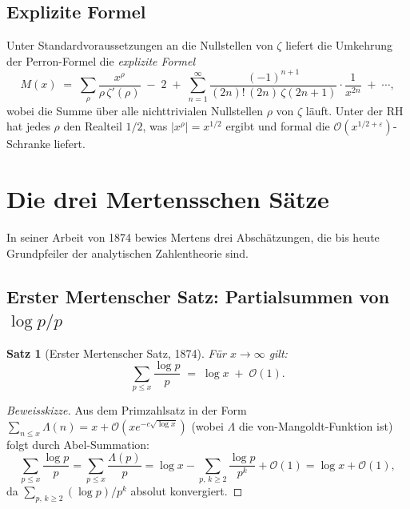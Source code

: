 \documentclass[12pt,a4paper]{amsart}
\newtheorem{theorem}{Satz}[section]
\theoremstyle{definition}
\newcommand{\BigO}{\mathcal{O}}
\begin{document}
\subsection{Explizite Formel}

Unter Standardvoraussetzungen an die Nullstellen von $\zeta$ liefert die
Umkehrung der Perron-Formel die \emph{explizite Formel}
\begin{equation}
\label{gl:explizit}
  M(x) \;=\; \sum_{\rho}\frac{x^{\rho}}{\rho\,\zeta'(\rho)}
           \;-\; 2 \;+\; \sum_{n=1}^{\infty}
           \frac{(-1)^{n+1}}{(2n)!\,(2n)\,\zeta(2n+1)} \cdot \frac{1}{x^{2n}}
           \;+\; \cdots,
\end{equation}
wobei die Summe über alle nichttrivialen Nullstellen $\rho$ von $\zeta$ läuft.
Unter der RH hat jedes $\rho$ den Realteil $1/2$, was
$|x^{\rho}| = x^{1/2}$ ergibt und formal die $\BigO(x^{1/2+\varepsilon})$-Schranke
liefert.

\section{Die drei Mertensschen Sätze}
\label{sec:drei-saetze}

In seiner Arbeit von 1874 bewies Mertens drei Abschätzungen, die bis heute
Grundpfeiler der analytischen Zahlentheorie sind.

\subsection{Erster Mertenscher Satz: Partialsummen von \texorpdfstring{$\log p/p$}{log p/p}}

\begin{theorem}[Erster Mertenscher Satz, 1874]
\label{satz:mertens1}
Für $x \to \infty$ gilt:
\[
  \sum_{p \le x} \frac{\log p}{p} \;=\; \log x \;+\; \BigO(1).
\]
\end{theorem}

\begin{proof}[Beweisskizze]
Aus dem Primzahlsatz in der Form
$\sum_{n \le x}\Lambda(n) = x + \BigO(x e^{-c\sqrt{\log x}})$ (wobei $\Lambda$
die von-Mangoldt-Funktion ist) folgt durch Abel-Summation:
\[
  \sum_{p \le x}\frac{\log p}{p}
  = \sum_{p \le x}\frac{\Lambda(p)}{p}
  = \log x - \sum_{p,\,k \ge 2}\frac{\log p}{p^k} + \BigO(1)
  = \log x + \BigO(1),
\]
da $\sum_{p,\,k \ge 2} (\log p)/p^k$ absolut konvergiert.
\end{proof}
\end{document}
